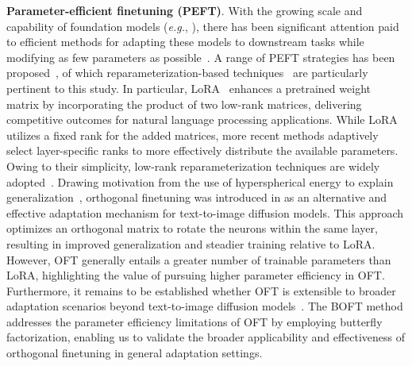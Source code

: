 \textbf{Parameter-efficient finetuning (PEFT)}. With the growing scale and capability of foundation models (\emph{e.g.}, \cite{brown2020language,radford2021learning,rombach2022high,kirillov2023segment}), there has been significant attention paid to efficient methods for adapting these models to downstream tasks while modifying as few parameters as possible~\cite{treviso2023efficient,ding2023parameter,lialin2023scaling}. A range of PEFT strategies has been proposed~\cite{houlsby2019parameter,aghajanyan2020intrinsic,hulora2022,edalati2022krona,wang2022adamix,gheini2021cross,zaken2022bitfit,guo2020parameter,sung2021training,ansell2022composable,lester2021power,li2021prefix,vu2022spot,he2021towards,mao2021unipelt,karimi2021compacter,liu2022few,sung2022lst,chen2022parameter,jia2022visual,chen2022adaptformer,zhang2022neural,jie2023fact,lian2022scaling,luo2023towards}, of which reparameterization-based techniques~\cite{aghajanyan2020intrinsic,hulora2022,edalati2022krona} are particularly pertinent to this study. In particular, LoRA~\cite{hulora2022} enhances a pretrained weight matrix by incorporating the product of two low-rank matrices, delivering competitive outcomes for natural language processing applications. While LoRA utilizes a fixed rank for the added matrices, more recent methods \cite{zhang2022adaptive,valipour2022dylora,zhang2023increlora} adaptively select layer-specific ranks to more effectively distribute the available parameters. Owing to their simplicity, low-rank reparameterization techniques are widely adopted~\cite{dettmers2023qlora,zi2023delta,chavan2023one}. Drawing motivation from the use of hyperspherical energy to explain generalization~\cite{liu2018learning,liu2021orthogonal}, orthogonal finetuning was introduced in \cite{qiu2023controlling} as an alternative and effective adaptation mechanism for text-to-image diffusion models. This approach optimizes an orthogonal matrix to rotate the neurons within the same layer, resulting in improved generalization and steadier training relative to LoRA. However, OFT generally entails a greater number of trainable parameters than LoRA, highlighting the value of pursuing higher parameter efficiency in OFT. Furthermore, it remains to be established whether OFT is extensible to broader adaptation scenarios beyond text-to-image diffusion models~\cite{qiu2023controlling}. The BOFT method addresses the parameter efficiency limitations of OFT by employing butterfly factorization, enabling us to validate the broader applicability and effectiveness of orthogonal finetuning in general adaptation settings.

